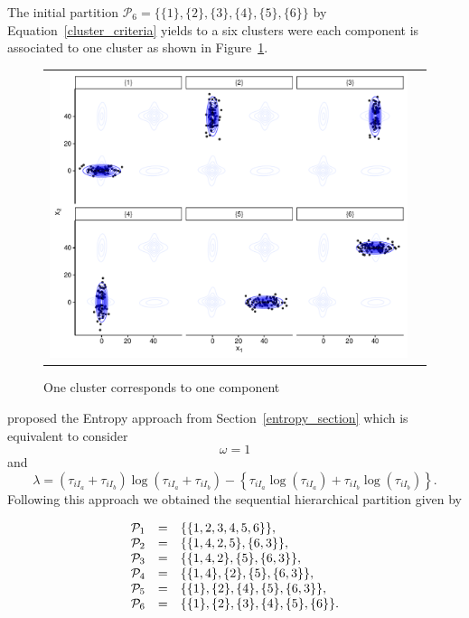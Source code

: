 \documentclass[submit]{smj}
\theoremstyle{definition}
\begin{document}
The initial partition  $\mathcal{P}_6 = \{ \{1\},\{2\}, \{3\}, \{4\}, \{5\}, \{6\} \}$  by Equation~\ref{cluster_criteria} yields to a six clusters were each component is associated to one cluster as shown in Figure~\ref{ex_one_one}.

\begin{figure}[h]
\begin{center}
\begin{tabular}{cc}
  \includegraphics[width=\textwidth]{figures/partition-example-part6.pdf} \\
 \end{tabular}
 \caption{One cluster corresponds to one component}\label{ex_one_one}
\end{center}
\end{figure}

 \cite{baudry2010combining} proposed the Entropy approach from Section~\ref{entropy_section} which is equivalent to consider \[\omega = 1\] and \[\lambda = (\tau_{iI_a}+\tau_{iI_b}) \log(\tau_{iI_a} + \tau_{iI_b}) - \left\{ \tau_{iI_a} \log(\tau_{iI_a}) + \tau_{iI_b} \log(\tau_{iI_b}) \right\}.\] Following this approach we obtained the sequential hierarchical partition given by 

\begin{equation}
\begin{array}{r c l}
\mathcal{P}_1 &=& \{\{1, 2, 3, 4, 5, 6\}\}, \\
\mathcal{P}_2 &=& \{\{1, 4, 2, 5\}, \{6, 3\} \},  \\
\mathcal{P}_3 &=& \{\{1, 4, 2\}, \{5\}, \{6, 3\} \}, \\
\mathcal{P}_4 &=& \{\{1, 4\},\{2\}, \{5\}, \{6, 3\} \}, \\
\mathcal{P}_5 &=& \{\{1\},\{2\},\{4\},\{5\},\{6,3\} \},\\
\mathcal{P}_6 &=& \{\{1\},\{2\},\{3\},\{4\},\{5\},\{6\}\}.
\end{array}
\label{hier_ex}
\end{equation}
\end{document}
